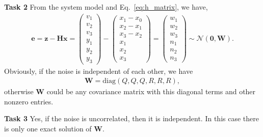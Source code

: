 \documentclass[12pt,a4paper]{article}
\newcommand{\vct}[1]{\boldsymbol{#1}}
\newcommand{\mtx}[1]{\mathbf{#1}}
\newcommand{\set}[1]{\mathcal{#1}}
\newcommand{\fnc}[1]{\text{#1}}
\begin{document}
    \textsf{\textbf{Task 2}}
    From the system model and Eq.~\ref{eq:h_matrix},
    we have,
    \begin{eqnarray}\label{eq:n_vector}
      \vct{e} 
      = \vct{z} - \mtx{H}\vct{x}
      = \begin{pmatrix} v_1 \\ v_2 \\ v_3 \\ y_1 \\ y_2 \\ y_3 \end{pmatrix}
          -  \begin{pmatrix} x_1 - x_0 \\ x_2 - x_1 \\ x_3 - x_2 \\ x_1 \\ x_2 \\ x_3 \end{pmatrix}
      = \begin{pmatrix} w_1 \\ w_2 \\ w_3 \\ n_1 \\ n_2 \\ n_3 \end{pmatrix}
      \sim \set{N}(\vct{0},\mtx{W}).
    \end{eqnarray}
    Obviously, if the noise is independent of each other, 
    we have
    \begin{eqnarray}\label{eq:n_vector}
      \mtx{W} = \fnc{diag}(Q,Q,Q,R,R,R),
    \end{eqnarray}
    otherwise $\mtx{W}$ could be any covariance matrix with
    this diagonal terms and other nonzero entries.

    \textsf{\textbf{Task 3}}
    Yes, if the noise is uncorrelated, then it is independent.
    In this case there is only one exact solution of $\mtx{W}$.
\end{document}

